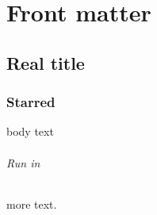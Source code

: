 \part{Front matter}

\chapter[Toc entry]{Real title} %

\section*{Starred}

body text

\paragraph{Run in}

more text.
